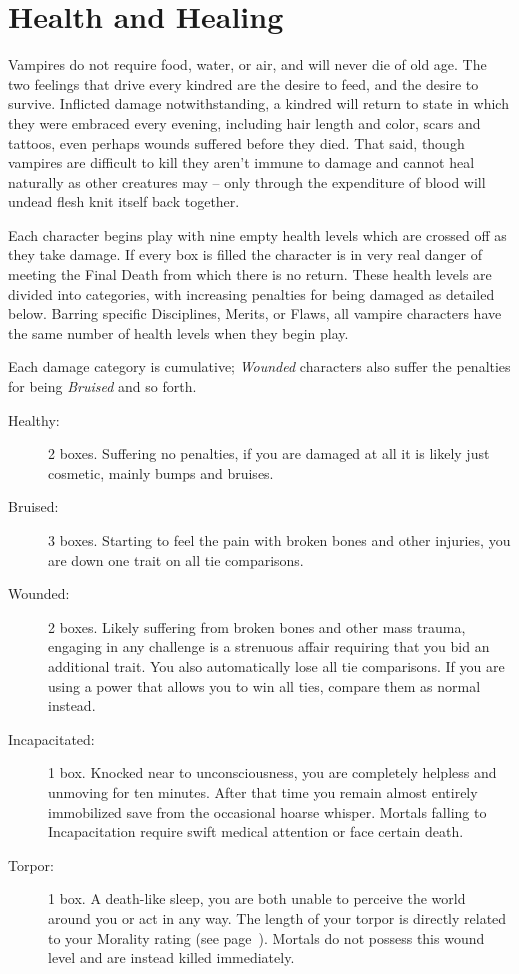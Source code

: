 \section{Health and Healing}
\label{sec:health}
Vampires do not require food, water, or air, and will never die of old age.  The two feelings 
that drive every kindred are the desire to feed, and the desire to survive.  Inflicted damage 
notwithstanding, a kindred will return to state in which they were embraced every evening, 
including hair 	length and color, scars and tattoos, even perhaps wounds suffered before they 
died.  That said, though vampires are difficult to kill they aren't immune to damage and cannot 
heal naturally as other creatures may -- only through the expenditure of blood will undead flesh 
knit itself back together.

Each character begins play with nine empty health levels which are 
crossed off as they take damage.  If every box is filled the character 
is in very real danger of meeting the Final Death from which there is 
no return.  These health levels are divided into categories, with 
increasing penalties for being damaged as detailed below.  Barring 
specific Disciplines, Merits, or Flaws, all vampire characters have 
the same number of health levels when they begin play.

Each damage category is cumulative; \emph{Wounded} characters also suffer 
the penalties for being \emph{Bruised} and so forth.

\begin{description}
	\item[Healthy:] 2 boxes.  Suffering no penalties, if you are 
	damaged at all it is likely just cosmetic, mainly bumps and bruises.
	\item[Bruised:] 3 boxes.  Starting to feel the pain with broken bones 
	and other injuries, you are down one trait on all tie comparisons.
	\item[Wounded:] 2 boxes.  Likely suffering from broken bones 
	and other mass trauma, engaging in any challenge is a strenuous 
	affair requiring that you bid an additional trait.  You also automatically 
	lose all tie comparisons.  If you are using a power that allows you to win 
	all ties, compare them as normal instead.
	\item[Incapacitated:] 1 box.  Knocked near to unconsciousness, 
	you are completely helpless and unmoving for ten minutes.  After 
	that time you remain almost entirely immobilized save from the 
	occasional hoarse whisper.  Mortals falling to Incapacitation 
	require swift medical attention or face certain death.
	\item[Torpor:] 1 box.  A death-like sleep, you are both unable 
	to perceive the world around you or act in any way.  The length 
	of your torpor is directly related to your Morality rating 
	(see page~\pageref{sec:health}).  Mortals do not possess this 
	wound level and are instead killed immediately.
\end{description}


